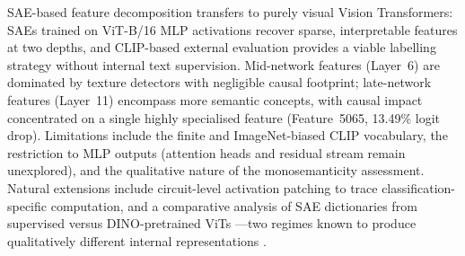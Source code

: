 SAE-based feature decomposition transfers to purely visual Vision Transformers: SAEs trained on ViT-B/16 MLP activations recover sparse, interpretable features at two depths, and CLIP-based external evaluation provides a viable labelling strategy without internal text supervision. Mid-network features (Layer~6) are dominated by texture detectors with negligible causal footprint; late-network features (Layer~11) encompass more semantic concepts, with causal impact concentrated on a single highly specialised feature (Feature~5065, 13.49\% logit drop). Limitations include the finite and ImageNet-biased CLIP vocabulary, the restriction to MLP outputs (attention heads and residual stream remain unexplored), and the qualitative nature of the monosemanticity assessment. Natural extensions include circuit-level activation patching to trace classification-specific computation, and a comparative analysis of SAE dictionaries from supervised versus DINO-pretrained ViTs \cite{Caron2021}---two regimes known to produce qualitatively different internal representations \cite{Raghu2021}.
